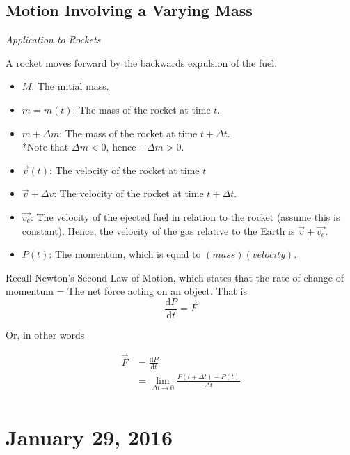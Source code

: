 \documentclass[11pt]{article}
\theoremstyle{plain} %
\theoremstyle{definition}
\theoremstyle{example}
\theoremstyle{remark}
\begin{document}
\subsection{Motion Involving a Varying Mass}



\em{Application to Rockets}\em

A rocket moves forward by the backwards expulsion of the fuel.

\begin{itemize}
	\item $M$: The initial mass.
	\item $m = m(t)$: The mass of the rocket at time $t$.
	\item $m + \Delta m$: The mass of the rocket at time $t + \Delta t$.\\*Note that $\Delta m < 0$, hence $-\Delta m > 0$.
	\item $\vec{v}(t)$: The velocity of the rocket at time $t$
	\item $\vec{v} + \Delta v$: The velocity of the rocket at time $t + \Delta t$.
	\item $\vec{v_e}$: The velocity of the ejected fuel in relation to the rocket (assume this is constant). Hence, the velocity of the gas relative to the Earth is $\vec{v}+\vec{v_e}$.
	\item$P(t)$: The momentum, which is equal to $(mass)(velocity)$. 
\end{itemize}
	
Recall Newton's Second Law of Motion, which states that the rate of change of momentum = The net force acting on an object. That is
$$	\frac{\mathrm d P}{\mathrm d t }= \vec{F}$$

Or,  in other words

\begin{align*}
	\vec{F}&= \frac{\mathrm d P}{\mathrm d t } \\
	&= \lim_{\Delta t \to 0}  \frac{P(t + \Delta t) - P(t)}{\Delta t}\\
\end{align*}




















\section{January 29, 2016}
\end{document}
